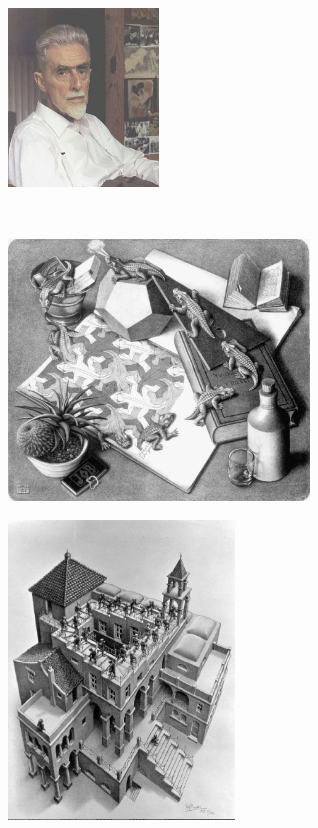 \begin{frame}
\begin{minipage}{5cm}
\includegraphics[width=4cm]{figures/escher_photo.jpg}
\end{minipage}
\begin{minipage}{5cm}
 \\
\end{minipage}
\end{frame}

\begin{frame}
\begin{center}
\begin{minipage}{8cm}
\includegraphics[width=8cm]{figures/escher1.jpg}
\end{minipage}
\end{center}
\end{frame}

\begin{frame}
\begin{center}
\begin{minipage}{6cm}
\includegraphics[width=6cm]{figures/escher2.jpg}
\end{minipage}
\end{center}
\end{frame}

